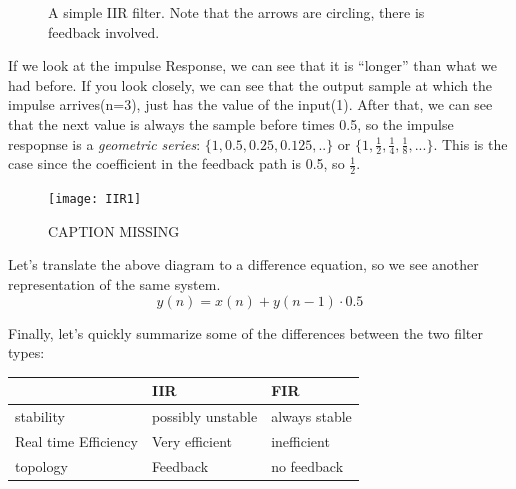 \begin{figure}[htb]
  \centering  
  \label{fig:IIRlowpass}

  \caption{A simple IIR filter. Note that the arrows are circling, there is feedback involved.}
\end{figure}


If we look at the impulse Response, we can see that it is  ``longer'' than what we had before. If you look closely, we can see that the output sample at which the impulse arrives(n=3), just has the value of the input(1). After that, we can see that the next value is always the sample before times 0.5, so the impulse respopnse is a \textit{geometric series}: $\{1,0.5,0.25,0.125,..\}$ or $\{1, \frac{1}{2}, \frac{1}{4}, \frac{1}{8}, ...\}$. This is the case since the coefficient in the feedback path is 0.5, so $\frac{1}{2}$. 


\begin{figure}[H]
	\centering
	\texttt{[image: IIR1]}
	\caption[shortCaption]
	{CAPTION MISSING}
	\label{fig:label}
\end{figure}

Let's translate the above diagram to a difference equation, so we see another representation of the same system.
\begin{equation}
 	y(n) = x(n)+y(n-1) \cdot 0.5
 \end{equation} 

Finally, let's quickly summarize some of the differences between the two filter types:
\begin{center}
	
\begin{tabular}{l|l|l}

& \textbf{IIR} & \textbf{FIR} \\
\hline
stability & possibly unstable & always stable \\
Real time Efficiency & Very efficient & inefficient \\
topology & Feedback & no feedback \\

\end{tabular}
\end{center}

